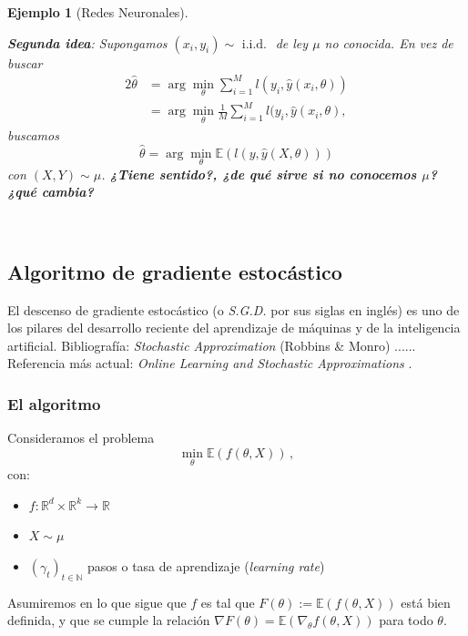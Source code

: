 \documentclass[letterpaper,11pt]{article} %
\theoremstyle{defbreak}
\newtheorem{example}{Ejemplo}[subsection]
\theoremstyle{propbreak}
\theoremstyle{remark}
\theoremstyle{break}
\def\R{\mathbb{R}}
\def\E{\mathbb{E}}
\def\N{\mathbb{N}}
\def\iid{\mbox{ i.i.d. }}
\begin{document}
\begin{example}[Redes Neuronales]
\begin{itemize}
\end{itemize}
\textbf{Segunda idea}: Supongamos $(x_i,y_i)\sim\iid$ de ley $\mu$ no conocida.
\newline En vez de buscar
\begin{alignat*}{2}
        \hat{\theta} & = \displaystyle\arg\min_\theta\sum^M_{i=1}l(y_i,\hat{y}(x_i,\theta)) \\
         & = \arg\min_\theta \frac{1}{M}\sum^M_{i=1}l(y_i,\hat{y}(x_i,\theta), 
    \end{alignat*}
buscamos
$$ \hat{\theta}=\displaystyle\arg\min_\theta \E(l(y,\hat{y}(X,\theta)))$$
con $(X,Y)\sim\mu$.
\newp \textbf{¿Tiene sentido?, ¿de qué sirve si no conocemos $\mu$? ¿qué cambia?}
\end{example}
\vspace{1cm}\\
\subsection{Algoritmo de gradiente estocástico}
El descenso de gradiente estocástico (o \textit{S.G.D.} por sus siglas en inglés) es uno de los pilares del desarrollo reciente del aprendizaje de máquinas y de la inteligencia artificial.
\newp Bibliografía: \textit{Stochastic Approximation} (Robbins \& Monro) \cite{robbins}...... Referencia m\'as actual: \textit{Online Learning and Stochastic Approximations} \cite{bottou}.

\subsubsection{El algoritmo}
Consideramos el problema
$$ \min_\theta \E(f(\theta,X)) \, ,$$
con:
\begin{itemize}
\item $f:\R^d\times \R^k\to\R$
    \item $X\sim\mu$
    \item $(\gamma_t)_{t\in\N}$ pasos o tasa de aprendizaje (\textit{learning rate})
\end{itemize}
 Asumiremos en lo que sigue que $f$ es tal que $F(\theta):= \E(f(\theta,X))$ est\'a bien definida, y que se cumple la relaci\'on $\nabla F(\theta)=\E(\nabla_\theta f(\theta,X)) $ para todo $\theta$.
 
\end{document}
